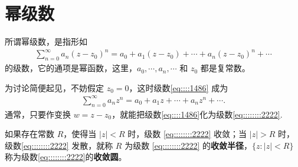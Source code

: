 \documentclass[../../main.tex]{subfiles}
\begin{document}
\section{幂级数}

\begin{definition}
所谓幂级数，是指形如
\begin{align}
\sum_{n=0}^{\infty} a_n(z - z_0)^n = a_0 + a_1(z - z_0) + \cdots  + a_n(z - z_0)^n + \cdots \label{eq::::1486}
\end{align}
的级数，它的通项是幂函数，这里，\( a_0, \cdots, a_n, \cdots \) 和 \( z_0 \) 都是复常数。
\end{definition}
\begin{remark}
为讨论简便起见，不妨假定 \( z_0 = 0 \)，这时级数\eqref{eq::::1486} 成为
\begin{align}
\sum_{n=0}^{\infty} a_n z^n = a_0 + a_1 z + \cdots + a_n z^n + \cdots. \label{eq::::::::2222}
\end{align}
通常，只要作变换 \( w = z - z_0 \)，就能把级数\eqref{eq::::1486}化为级数\eqref{eq::::::::2222}.
\end{remark}

\begin{definition}
如果存在常数 \( R \)，使得当 \( |z| < R \) 时，级数 \eqref{eq::::::::2222} 收敛；当 \( |z| > R \) 时，级数\eqref{eq::::::::2222} 发散，就称 \( R \) 为级数 \eqref{eq::::::::2222} 的\textbf{收敛半径}，\( \{z : |z| < R\} \) 称为级数\eqref{eq::::::::2222}的\textbf{收敛圆}。
\end{definition}
\end{document}

